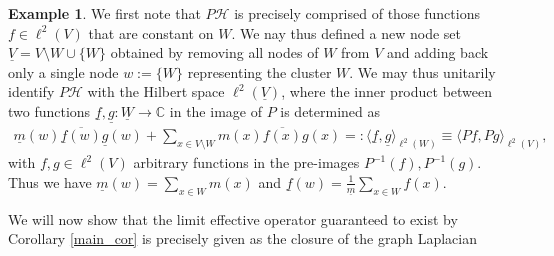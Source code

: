 \documentclass[reqno,12pt,letterpaper]{amsart}
\numberwithin{equation}{section}
\newcommand{\1}{\mathds{1}}
\theoremstyle{definition}
\newtheorem{Ex}[Th]{Example}
\begin{document}
\begin{Ex}
We first note that $P\mathcal{H}$ is precisely comprised of those functions $f \in \ell^2(V)$ that are constant on $W$. We nay thus defined a new node set $\underline{V} = V\setminus W \cup \{W\}$ obtained by removing all nodes of $W$ from $V$ and adding back only a single node   $w := \{W\}$ representing the cluster $W$. We may thus unitarily identify $P \mathcal{H}$ with the Hilbert space $\ell^2(\underline{V})$, where the inner product between two functions $\underline{f}, \underline{g}: \underline{W} \rightarrow \mathds{C}$ in the image of $P$ is determined as 
\begin{align}
\underline{m}(w) \overline{\underline{f}(w)} \underline{g}(w) +	 \sum\limits_{x \in V\setminus W} m(x) \overline{f(x)} g(x) =: \langle \underline{f}, \underline{g} \rangle_{\ell^2(W)} \equiv \langle Pf, Pg \rangle_{\ell^2(V)},
\end{align}
with $f,g \in \ell^2(V)$ arbitrary functions in the pre-images $P^{-1}(f), P^{-1}(g)$. Thus we have $\underline{m}(w) = \sum_{x \in W} m(x)$ and $\underline{f}(w) = \frac{1}{\underline{m}} \sum_{x \in W} f(x)$.



We will now show that the limit effective operator guaranteed to exist by Corollary  \ref{main_cor} is precisely given as the closure of the graph Laplacian 


\end{Ex}
\end{document}
